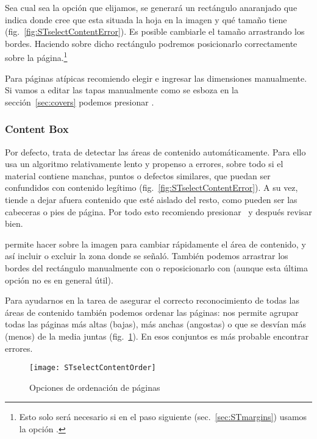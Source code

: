 \documentclass[%
	a5paper,
	10pt,
	twoside,
	openright,
	final,
]{memoir}
\begin{document}
	Sea cual sea la opción que elijamos, se generará un rectángulo anaranjado que indica donde \scantailor cree que esta situada la hoja en la imagen y qué tamaño tiene (fig.~\ref{fig:STselectContentError}). Es posible cambiarle el tamaño arrastrando los bordes. Haciendo  sobre dicho rectángulo podremos posicionarlo correctamente sobre la página.\footnote{Esto solo será necesario si en el paso siguiente (sec.~\ref{sec:STmargins}) usamos la opción .}

	Para páginas atípicas recomiendo elegir  e ingresar las dimensiones manualmente. Si vamos a editar las tapas manualmente como se esboza en la sección~\ref{sec:covers} podemos presionar .

	\subsubsection{Content Box} Por defecto, \scantailor trata de detectar las áreas de contenido automáticamente. Para ello usa un algoritmo relativamente lento y propenso a errores, sobre todo si el material contiene manchas, puntos o defectos similares, que puedan ser confundidos con contenido legítimo (fig.~\ref{fig:STselectContentError}). A su vez, tiende a dejar afuera contenido que esté aislado del resto, como pueden ser las cabeceras o pies de página. Por todo esto recomiendo presionar \play\ y después revisar bien.

	\scantailorAdvanced permite hacer \menu{\leftclick\,\leftclick} sobre la imagen para cambiar rápidamente el área de contenido, y así incluir o excluir la zona donde se señaló. También podemos arrastrar los bordes del rectángulo manualmente con  o reposicionarlo con  (aunque esta última opción no es en general útil).

	Para ayudarnos en la tarea de asegurar el correcto reconocimiento de todas las áreas de contenido también podemos ordenar las páginas:  nos permite agrupar todas las páginas más altas (bajas), más anchas (angostas) o que se desvían más (menos) de la media juntas (fig.~\ref{fig:STselectContentOrder}). En esos conjuntos es más probable encontrar errores.

	\begin{figure}
		\centering
		\texttt{[image: STselectContentOrder]}
		\caption{Opciones de ordenación de páginas\label{fig:STselectContentOrder}}
	\end{figure}
\end{document}
